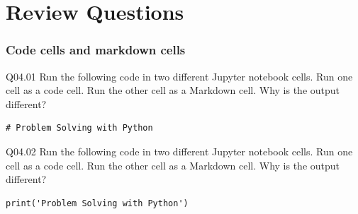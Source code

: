 \documentclass{book}
\newenvironment{problems}{}{}  %
\begin{document}
    
        \section{Review Questions}\label{review-questions}
    




    
        \begin{problems}
        \subsubsection{Code cells and markdown
cells}\label{code-cells-and-markdown-cells}

Q04.01 Run the following code in two different Jupyter notebook cells.
Run one cell as a code cell. Run the other cell as a Markdown cell. Why
is the output different?

\begin{lstlisting}
# Problem Solving with Python
\end{lstlisting}

Q04.02 Run the following code in two different Jupyter notebook cells.
Run one cell as a code cell. Run the other cell as a Markdown cell. Why
is the output different?

\begin{lstlisting}
print('Problem Solving with Python')
\end{lstlisting}
        \end{problems}

    
\end{document}
